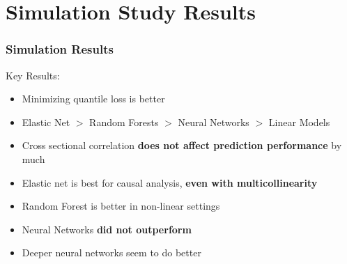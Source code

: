 \documentclass[aspectratio=169]{beamer}
\begin{document}


\section{Simulation Study Results}

\begin{frame}
\frametitle{Simulation Results}
Key Results:
\begin{itemize}
\item Minimizing quantile loss is better
\item Elastic Net $>$ Random Forests $>$ Neural Networks $>$ Linear Models
\item Cross sectional correlation \textbf{does not affect prediction performance} by much
\item Elastic net is best for causal analysis, \textbf{even with multicollinearity}
\item Random Forest is better in non-linear settings
\item Neural Networks \textbf{did not outperform}
\item Deeper neural networks seem to do better
\end{itemize}
\end{frame}
\end{document}
